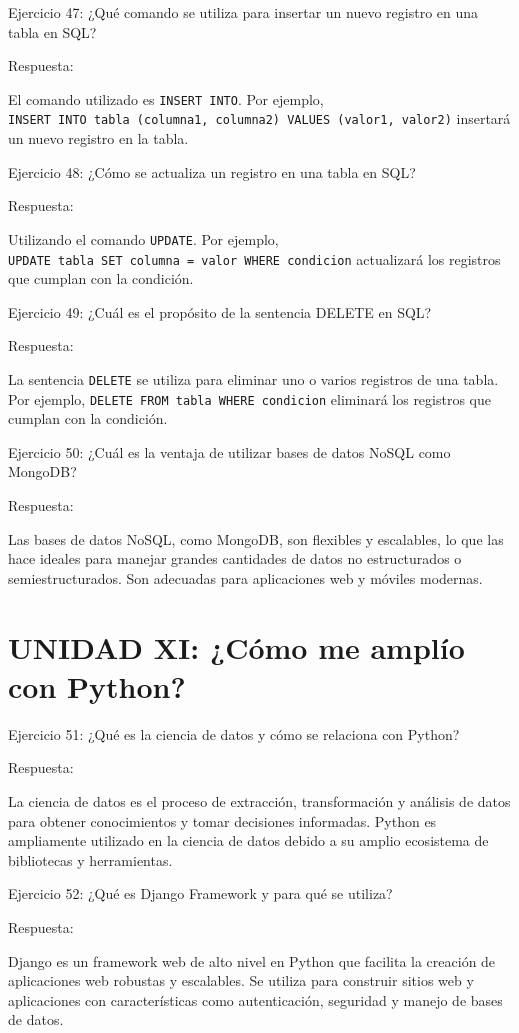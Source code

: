 \documentclass[
  a4paper,
  DIV=11,
  numbers=noendperiod,
  onepage,
  openany]{scrreprt}
\begin{document}
Ejercicio 47: ¿Qué comando se utiliza para insertar un nuevo registro en
una tabla en SQL?

Respuesta:

El comando utilizado es \texttt{INSERT\ INTO}. Por ejemplo,
\texttt{INSERT\ INTO\ tabla\ (columna1,\ columna2)\ VALUES\ (valor1,\ valor2)}
insertará un nuevo registro en la tabla.

Ejercicio 48: ¿Cómo se actualiza un registro en una tabla en SQL?

Respuesta:

Utilizando el comando \texttt{UPDATE}. Por ejemplo,
\texttt{UPDATE\ tabla\ SET\ columna\ =\ valor\ WHERE\ condicion}
actualizará los registros que cumplan con la condición.

Ejercicio 49: ¿Cuál es el propósito de la sentencia DELETE en SQL?

Respuesta:

La sentencia \texttt{DELETE} se utiliza para eliminar uno o varios
registros de una tabla. Por ejemplo,
\texttt{DELETE\ FROM\ tabla\ WHERE\ condicion} eliminará los registros
que cumplan con la condición.

Ejercicio 50: ¿Cuál es la ventaja de utilizar bases de datos NoSQL como
MongoDB?

Respuesta:

Las bases de datos NoSQL, como MongoDB, son flexibles y escalables, lo
que las hace ideales para manejar grandes cantidades de datos no
estructurados o semiestructurados. Son adecuadas para aplicaciones web y
móviles modernas.

\section{UNIDAD XI: ¿Cómo me amplío con
Python?}\label{unidad-xi-cuxf3mo-me-ampluxedo-con-python}

Ejercicio 51: ¿Qué es la ciencia de datos y cómo se relaciona con
Python?

Respuesta:

La ciencia de datos es el proceso de extracción, transformación y
análisis de datos para obtener conocimientos y tomar decisiones
informadas. Python es ampliamente utilizado en la ciencia de datos
debido a su amplio ecosistema de bibliotecas y herramientas.

Ejercicio 52: ¿Qué es Django Framework y para qué se utiliza?

Respuesta:

Django es un framework web de alto nivel en Python que facilita la
creación de aplicaciones web robustas y escalables. Se utiliza para
construir sitios web y aplicaciones con características como
autenticación, seguridad y manejo de bases de datos.
\end{document}
